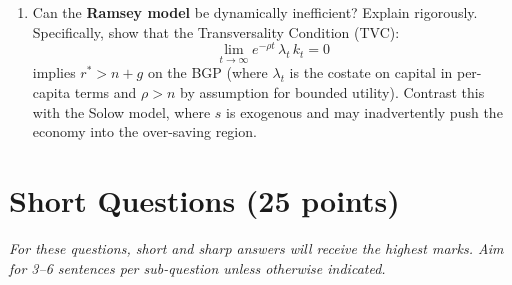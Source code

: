\documentclass[a4paper,11pt]{article}
\begin{document}
\begin{enumerate}[label=\textbf{\arabic*.}, leftmargin=*, itemsep=6pt]
\begin{enumerate}[label=(\alph*), itemsep=4pt]
        \item Can the \textbf{Ramsey model} be dynamically inefficient?  Explain
        rigorously.  Specifically, show that the Transversality Condition (TVC):
        \[
            \lim_{t\to\infty} e^{-\rho t}\,\lambda_t\,k_t = 0
        \]
        implies $r^* > n + g$ on the BGP (where $\lambda_t$ is the costate on capital
        in per-capita terms and $\rho > n$ by assumption for bounded utility).  Contrast
        this with the Solow model, where $s$ is exogenous and may inadvertently push the
        economy into the over-saving region.
    \end{enumerate}

\end{enumerate}

\clearpage

\section{Short Questions \hfill (25 points)}

\noindent\textit{For these questions, short and sharp answers will receive the highest marks.
Aim for 3--6 sentences per sub-question unless otherwise indicated.}

\vspace{8pt}
\end{document}
